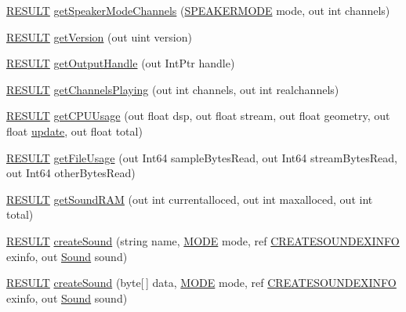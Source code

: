 \begin{DoxyCompactItemize}
\hyperlink{namespace_f_m_o_d_a305d1176ef3f8c8815861a60407ac33d}{R\+E\+S\+U\+LT} \hyperlink{class_f_m_o_d_1_1_system_a33b75777c0363c614826cca922b54d32}{get\+Speaker\+Mode\+Channels} (\hyperlink{namespace_f_m_o_d_aa0732e7e8efd3b96b526a7f2f8479634}{S\+P\+E\+A\+K\+E\+R\+M\+O\+DE} mode, out int channels)
\item 
\hyperlink{namespace_f_m_o_d_a305d1176ef3f8c8815861a60407ac33d}{R\+E\+S\+U\+LT} \hyperlink{class_f_m_o_d_1_1_system_a5b90cb0486a438be013594aed2c84dbb}{get\+Version} (out uint version)
\item 
\hyperlink{namespace_f_m_o_d_a305d1176ef3f8c8815861a60407ac33d}{R\+E\+S\+U\+LT} \hyperlink{class_f_m_o_d_1_1_system_aabf47dcc04f433fad4d82f5255c51eeb}{get\+Output\+Handle} (out Int\+Ptr handle)
\item 
\hyperlink{namespace_f_m_o_d_a305d1176ef3f8c8815861a60407ac33d}{R\+E\+S\+U\+LT} \hyperlink{class_f_m_o_d_1_1_system_a47e187c6b757f0c208595b3566ee4c70}{get\+Channels\+Playing} (out int channels, out int realchannels)
\item 
\hyperlink{namespace_f_m_o_d_a305d1176ef3f8c8815861a60407ac33d}{R\+E\+S\+U\+LT} \hyperlink{class_f_m_o_d_1_1_system_a70db38932c0a9c8d7dfc1ed1500721d5}{get\+C\+P\+U\+Usage} (out float dsp, out float stream, out float geometry, out float \hyperlink{class_f_m_o_d_1_1_system_a88ff07d3c56a36518d179100c8ef1fab}{update}, out float total)
\item 
\hyperlink{namespace_f_m_o_d_a305d1176ef3f8c8815861a60407ac33d}{R\+E\+S\+U\+LT} \hyperlink{class_f_m_o_d_1_1_system_a1c3c5a860eadebf0edd6ae4960d9263f}{get\+File\+Usage} (out Int64 sample\+Bytes\+Read, out Int64 stream\+Bytes\+Read, out Int64 other\+Bytes\+Read)
\item 
\hyperlink{namespace_f_m_o_d_a305d1176ef3f8c8815861a60407ac33d}{R\+E\+S\+U\+LT} \hyperlink{class_f_m_o_d_1_1_system_ac271228705f4aa0c6bbf2ed8178a9c97}{get\+Sound\+R\+AM} (out int currentalloced, out int maxalloced, out int total)
\item 
\hyperlink{namespace_f_m_o_d_a305d1176ef3f8c8815861a60407ac33d}{R\+E\+S\+U\+LT} \hyperlink{class_f_m_o_d_1_1_system_acaeb5380facc7fd7c2c990e03c5841cf}{create\+Sound} (string name, \hyperlink{namespace_f_m_o_d_a94ab158a8314f5f4248f1aea55dbefa3}{M\+O\+DE} mode, ref \hyperlink{struct_f_m_o_d_1_1_c_r_e_a_t_e_s_o_u_n_d_e_x_i_n_f_o}{C\+R\+E\+A\+T\+E\+S\+O\+U\+N\+D\+E\+X\+I\+N\+FO} exinfo, out \hyperlink{class_f_m_o_d_1_1_sound}{Sound} sound)
\item 
\hyperlink{namespace_f_m_o_d_a305d1176ef3f8c8815861a60407ac33d}{R\+E\+S\+U\+LT} \hyperlink{class_f_m_o_d_1_1_system_a6a90f637778db9d17e98cabc896e61e9}{create\+Sound} (byte\mbox{[}$\,$\mbox{]} data, \hyperlink{namespace_f_m_o_d_a94ab158a8314f5f4248f1aea55dbefa3}{M\+O\+DE} mode, ref \hyperlink{struct_f_m_o_d_1_1_c_r_e_a_t_e_s_o_u_n_d_e_x_i_n_f_o}{C\+R\+E\+A\+T\+E\+S\+O\+U\+N\+D\+E\+X\+I\+N\+FO} exinfo, out \hyperlink{class_f_m_o_d_1_1_sound}{Sound} sound)

\end{DoxyCompactItemize}
